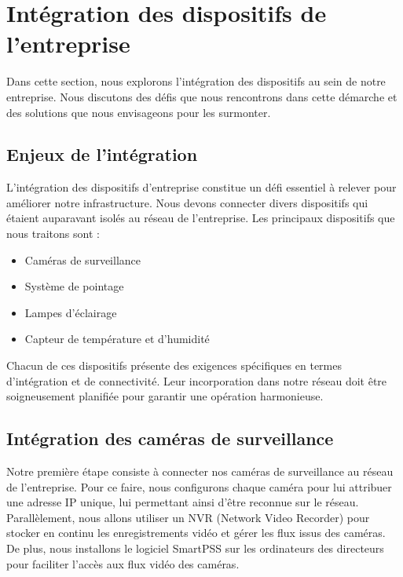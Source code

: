 \section{Intégration des dispositifs de l'entreprise}

Dans cette section, nous explorons l'intégration des dispositifs au sein de notre entreprise. Nous discutons des défis que nous rencontrons dans cette démarche et des solutions que nous envisageons pour les surmonter.

\subsection{Enjeux de l'intégration}

L'intégration des dispositifs d'entreprise constitue un défi essentiel à relever pour améliorer notre infrastructure. Nous devons connecter divers dispositifs qui étaient auparavant isolés au réseau de l'entreprise. Les principaux dispositifs que nous traitons sont :


\begin{itemize}
\item Caméras de surveillance

\item Système de pointage

\item Lampes d'éclairage

\item Capteur de température et d'humidité
\end{itemize}

Chacun de ces dispositifs présente des exigences spécifiques en termes d'intégration et de connectivité. Leur incorporation dans notre réseau doit être soigneusement planifiée pour garantir une opération harmonieuse.

\subsection{Intégration des caméras de surveillance}

Notre première étape consiste à connecter nos caméras de surveillance au réseau de l'entreprise. Pour ce faire, nous configurons chaque caméra pour lui attribuer une adresse IP unique, lui permettant ainsi d'être reconnue sur le réseau. Parallèlement, nous allons utiliser un NVR (Network Video Recorder) pour stocker en continu les enregistrements vidéo et gérer les flux issus des caméras. De plus, nous installons le logiciel SmartPSS sur les ordinateurs des directeurs pour faciliter l'accès aux flux vidéo des caméras.

